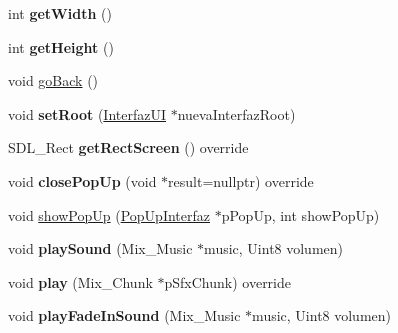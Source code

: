 \begin{DoxyCompactItemize}
\item 
int {\bfseries get\+Width} ()\hypertarget{class_game_manager_ab07784212df355b8820b3b8409540fc9}{}\label{class_game_manager_ab07784212df355b8820b3b8409540fc9}

\item 
int {\bfseries get\+Height} ()\hypertarget{class_game_manager_ac4640c4a2aa0af055a3956fb64e367fb}{}\label{class_game_manager_ac4640c4a2aa0af055a3956fb64e367fb}

\item 
void \hyperlink{class_game_manager_aaa4c8097c4e4288282a261e09ceebcb8}{go\+Back} ()
\item 
void {\bfseries set\+Root} (\hyperlink{class_interfaz_u_i}{Interfaz\+UI} $\ast$nueva\+Interfaz\+Root)\hypertarget{class_game_manager_a6528d38df521ce4915cd9a4aa11ed274}{}\label{class_game_manager_a6528d38df521ce4915cd9a4aa11ed274}

\item 
S\+D\+L\+\_\+\+Rect {\bfseries get\+Rect\+Screen} () override\hypertarget{class_game_manager_aea73783b9f80f19cf152c315c57ef556}{}\label{class_game_manager_aea73783b9f80f19cf152c315c57ef556}

\item 
void {\bfseries close\+Pop\+Up} (void $\ast$result=nullptr) override\hypertarget{class_game_manager_a7704714219244cdce6e3886636600fa6}{}\label{class_game_manager_a7704714219244cdce6e3886636600fa6}

\item 
void \hyperlink{class_game_manager_a79ed8c7a5bdef1baf9290dcab9b55db2}{show\+Pop\+Up} (\hyperlink{class_pop_up_interfaz}{Pop\+Up\+Interfaz} $\ast$p\+Pop\+Up, int show\+Pop\+Up)
\item 
void {\bfseries play\+Sound} (Mix\+\_\+\+Music $\ast$music, Uint8 volumen)\hypertarget{class_game_manager_a5cf620bf072bb560164861178583f64f}{}\label{class_game_manager_a5cf620bf072bb560164861178583f64f}

\item 
void {\bfseries play} (Mix\+\_\+\+Chunk $\ast$p\+Sfx\+Chunk) override\hypertarget{class_game_manager_a5c31941353e3ff3edac1f006b72171b4}{}\label{class_game_manager_a5c31941353e3ff3edac1f006b72171b4}

\item 
void {\bfseries play\+Fade\+In\+Sound} (Mix\+\_\+\+Music $\ast$music, Uint8 volumen)\hypertarget{class_game_manager_a78ba4ebeff8e2ff90e0f8ef965b916cb}{}\label{class_game_manager_a78ba4ebeff8e2ff90e0f8ef965b916cb}

\end{DoxyCompactItemize}

